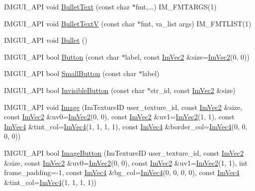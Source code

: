 \begin{DoxyCompactItemize}
\item 
I\+M\+G\+U\+I\+\_\+\+A\+PI void \hyperlink{namespace_im_gui_af8d34d563b17c683943a0fa7bf5807bc}{Bullet\+Text} (const char $\ast$fmt,...) I\+M\+\_\+\+F\+M\+T\+A\+R\+GS(1)
\item 
I\+M\+G\+U\+I\+\_\+\+A\+PI void \hyperlink{namespace_im_gui_af8f4b5e96c745e205974857f9a584583}{Bullet\+TextV} (const char $\ast$fmt, va\+\_\+list args) I\+M\+\_\+\+F\+M\+T\+L\+I\+ST(1)
\item 
I\+M\+G\+U\+I\+\_\+\+A\+PI void \hyperlink{namespace_im_gui_ae2d22212681556d2c2398dfd152f3121}{Bullet} ()
\item 
I\+M\+G\+U\+I\+\_\+\+A\+PI bool \hyperlink{namespace_im_gui_a38094c568ce398db5a3abb9d3ac92030}{Button} (const char $\ast$label, const \hyperlink{struct_im_vec2}{Im\+Vec2} \&size=\hyperlink{struct_im_vec2}{Im\+Vec2}(0, 0))
\item 
I\+M\+G\+U\+I\+\_\+\+A\+PI bool \hyperlink{namespace_im_gui_a5b76ec69758aeb0a00a66f142f7a4fb2}{Small\+Button} (const char $\ast$label)
\item 
I\+M\+G\+U\+I\+\_\+\+A\+PI bool \hyperlink{namespace_im_gui_a22668d440cbbb1f8be07241d9c6d9096}{Invisible\+Button} (const char $\ast$str\+\_\+id, const \hyperlink{struct_im_vec2}{Im\+Vec2} \&size)
\item 
I\+M\+G\+U\+I\+\_\+\+A\+PI void \hyperlink{namespace_im_gui_ad8705ac3b718c1b2e84e7b8c34f90249}{Image} (Im\+Texture\+ID user\+\_\+texture\+\_\+id, const \hyperlink{struct_im_vec2}{Im\+Vec2} \&size, const \hyperlink{struct_im_vec2}{Im\+Vec2} \&uv0=\hyperlink{struct_im_vec2}{Im\+Vec2}(0, 0), const \hyperlink{struct_im_vec2}{Im\+Vec2} \&uv1=\hyperlink{struct_im_vec2}{Im\+Vec2}(1, 1), const \hyperlink{struct_im_vec4}{Im\+Vec4} \&tint\+\_\+col=\hyperlink{struct_im_vec4}{Im\+Vec4}(1, 1, 1, 1), const \hyperlink{struct_im_vec4}{Im\+Vec4} \&border\+\_\+col=\hyperlink{struct_im_vec4}{Im\+Vec4}(0, 0, 0, 0))
\item 
I\+M\+G\+U\+I\+\_\+\+A\+PI bool \hyperlink{namespace_im_gui_ac79ef64e8b9e1db73d8237f6a999da14}{Image\+Button} (Im\+Texture\+ID user\+\_\+texture\+\_\+id, const \hyperlink{struct_im_vec2}{Im\+Vec2} \&size, const \hyperlink{struct_im_vec2}{Im\+Vec2} \&uv0=\hyperlink{struct_im_vec2}{Im\+Vec2}(0, 0), const \hyperlink{struct_im_vec2}{Im\+Vec2} \&uv1=\hyperlink{struct_im_vec2}{Im\+Vec2}(1, 1), int frame\+\_\+padding=-\/1, const \hyperlink{struct_im_vec4}{Im\+Vec4} \&bg\+\_\+col=\hyperlink{struct_im_vec4}{Im\+Vec4}(0, 0, 0, 0), const \hyperlink{struct_im_vec4}{Im\+Vec4} \&tint\+\_\+col=\hyperlink{struct_im_vec4}{Im\+Vec4}(1, 1, 1, 1))

\end{DoxyCompactItemize}
